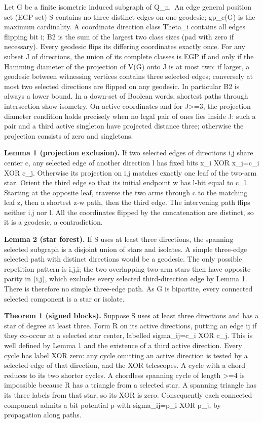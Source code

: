 \documentclass[
]{article}
\begin{document}
Let G be a finite isometric induced subgraph of Q\_n.~An edge general
position set (EGP set) S contains no three distinct edges on one
geodesic; gp\_e(G) is the maximum cardinality. A coordinate direction
class Theta\_i contains all edges flipping bit i; B2 is the sum of the
largest two class sizes (pad with zero if necessary). Every geodesic
flips its differing coordinates exactly once. For any subset J of
directions, the union of its complete classes is EGP if and only if the
Hamming diameter of the projection of V(G) onto J is at most two: if
larger, a geodesic between witnessing vertices contains three selected
edges; conversely at most two selected directions are flipped on any
geodesic. In particular B2 is always a lower bound. In a down-set of
Boolean words, shortest paths through intersection show isometry. On
active coordinates and for \textbar J\textbar\textgreater=3, the
projection diameter condition holds precisely when no legal pair of ones
lies inside J: such a pair and a third active singleton have projected
distance three; otherwise the projection consists of zero and
singletons.

\textbf{Lemma 1 (projection exclusion).} If two selected edges of
directions i,j share center c, any selected edge of another direction l
has fixed bits x\_i XOR x\_j=c\_i XOR c\_j. Otherwise its projection on
i,j matches exactly one leaf of the two-arm star. Orient the third edge
so that its initial endpoint w has l-bit equal to c\_l. Starting at the
opposite leaf, traverse the two arms through c to the matching leaf z,
then a shortest z-w path, then the third edge. The intervening path
flips neither i,j nor l. All the coordinates flipped by the
concatenation are distinct, so it is a geodesic, a contradiction.

\textbf{Lemma 2 (star forest).} If S uses at least three directions, the
spanning selected subgraph is a disjoint union of stars and isolates. A
simple three-edge selected path with distinct directions would be a
geodesic. The only possible repetition pattern is i,j,i; the two
overlapping two-arm stars then have opposite parity in (i,j), which
excludes every selected third-direction edge by Lemma 1. There is
therefore no simple three-edge path. As G is bipartite, every connected
selected component is a star or isolate.

\textbf{Theorem 1 (signed blocks).} Suppose S uses at least three
directions and has a star of degree at least three. Form R on its active
directions, putting an edge ij if they co-occur at a selected star
center, labelled sigma\_ij=c\_i XOR c\_j. This is well defined by Lemma
1 and the existence of a third active direction. Every cycle has label
XOR zero: any cycle omitting an active direction is tested by a selected
edge of that direction, and the XOR telescopes. A cycle with a chord
reduces to its two shorter cycles. A chordless spanning cycle of length
\textgreater=4 is impossible because R has a triangle from a selected
star. A spanning triangle has its three labels from that star, so its
XOR is zero. Consequently each connected component admits a bit
potential p with sigma\_ij=p\_i XOR p\_j, by propagation along paths.
\end{document}
